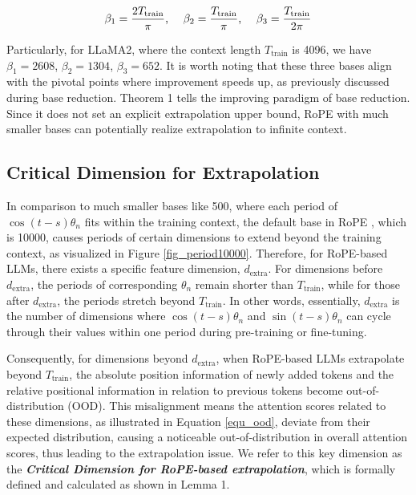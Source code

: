 \begin{equation}
\beta_1 = \frac{2 T_\text{train}}{\pi}\text{, \quad}\beta_2 = \frac{T_\text{train}}{\pi}\text{, \quad}\beta_3 = \frac{T_\text{train}}{2\pi}
\label{equ_smaller}\end{equation}

Particularly, for LLaMA2\citep{touvron2023llama2}, where the context length $T_\text{train}$ is 4096, we have $\beta_1=2608$, $\beta_2=1304$, $\beta_3=652$. It is worth noting that these three bases align with the pivotal points where improvement speeds up, as previously discussed during base reduction. Theorem 1 tells the improving paradigm of base reduction. Since it does not set an explicit extrapolation upper bound, RoPE with much smaller bases can potentially realize extrapolation to infinite context.

\subsection{Critical Dimension for Extrapolation}\label{subsec_dim}

In comparison to much smaller bases like 500, where each period of $\cos{(t-s)\theta_n}$ fits within the training context, the default base in RoPE \citep{su2021roformer}, which is 10000, causes periods of certain dimensions to extend beyond the training context, as visualized in Figure \ref{fig_period10000}. Therefore, for RoPE-based LLMs, there exists a specific feature dimension, $d_\text{extra}$. For dimensions before $d_\text{extra}$, the periods of corresponding $\theta_n$ remain shorter than $T_\text{train}$, while for those after $d_\text{extra}$, the periods stretch beyond $T_\text{train}$. In other words, essentially, $d_\text{extra}$ is the number of dimensions where $\cos{(t-s)\theta_n}$ and $\sin{(t-s)\theta_n}$ can cycle through their values within one period during pre-training or fine-tuning.

Consequently, for dimensions beyond $d_\text{extra}$, when RoPE-based LLMs extrapolate beyond $T_\text{train}$, the absolute position information of newly added tokens and the relative positional information in relation to previous tokens become out-of-distribution (OOD). This misalignment means the attention scores related to these dimensions, as illustrated in Equation \ref{equ_ood}, deviate from their expected distribution, causing a noticeable out-of-distribution in overall attention scores, thus leading to the extrapolation issue. We refer to this key dimension as the \textit{\textbf{Critical Dimension for RoPE-based extrapolation}}, which is formally defined and calculated as shown in Lemma 1.


